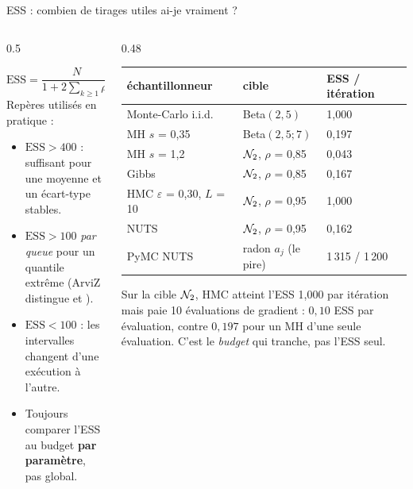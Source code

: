 \begin{frame}{ESS : combien de tirages utiles ai-je vraiment ?}
\small
\begin{columns}[t]
\begin{column}{0.5\textwidth}
\begin{ebox}
\[
\mathrm{ESS} = \frac{N}{1 + 2\sum_{k \ge 1}\rho_k},
\qquad
\text{MCSE} = \frac{\hat\sigma}{\sqrt{\mathrm{ESS}}} .
\]
Repères utilisés en pratique :
\begin{itemize}
  \item $\mathrm{ESS} > 400$ : suffisant pour une moyenne et un écart-type stables.
  \item $\mathrm{ESS} > 100$ \emph{par queue} pour un quantile extrême
        (ArviZ distingue  et ).
  \item $\mathrm{ESS} < 100$ : les intervalles changent d'une exécution à l'autre.
  \item Toujours comparer l'ESS au budget \textbf{par paramètre}, pas global.
\end{itemize}
\end{ebox}
\end{column}
\begin{column}{0.48\textwidth}
\begin{solbox}
\scriptsize\begin{tabular}{@{}p{2.4cm}p{1.8cm}p{1.8cm}@{}}
\toprule
échantillonneur & cible & ESS / itération \\
\midrule
Monte-Carlo i.i.d. & Beta$(2,5)$ & 1,000 \\
MH $s$ = 0,35 & Beta$(2{,}5;7)$ & 0,197 \\
MH $s$ = 1,2 & $\mathcal{N}_2$, $\rho$ = 0,85 & 0,043 \\
Gibbs & $\mathcal{N}_2$, $\rho$ = 0,85 & 0,167 \\
HMC $\varepsilon$ = 0,30, $L$ = 10 & $\mathcal{N}_2$, $\rho$ = 0,95 & 1,000 \\
NUTS & $\mathcal{N}_2$, $\rho$ = 0,95 & 0,162 \\
PyMC NUTS & radon $a_j$ (le pire) & 1 315 / 1 200 \\
\bottomrule
\end{tabular}
\end{solbox}
\begin{kbox}
Sur la cible $\mathcal{N}_2$, HMC atteint l'ESS 1,000 par itération mais paie 10 évaluations
de gradient : $0{,}10$ ESS par évaluation, contre $0{,}197$ pour un MH d'une seule
évaluation. C'est le \emph{budget} qui tranche, pas l'ESS seul.
\end{kbox}
\end{column}
\end{columns}
\end{frame}

